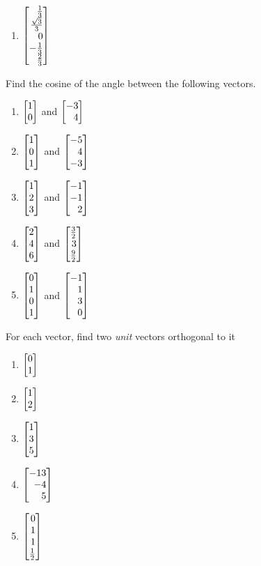 \begin{exercises}
\begin{problist}
\begin{enumerate}
			\item $\mat{\frac{1}{3}\\\frac{\sqrt{3}}{3}\\0\\-\frac{1}{3}\\\frac{2}{3}}$
		\end{enumerate}
		\prob Find the cosine of the angle between the following vectors.
		\begin{enumerate}
			\item $\mat{1\\0}$ and $\mat{-3\\4}$
			\item $\mat{1\\0\\1}$ and $\mat{-5\\4\\-3}$
			\item $\mat{1\\2\\3}$ and $\mat{-1\\-1\\2}$
			\item $\mat{2\\4\\6}$ and $\mat{\frac{3}{2}\\3\\\frac{9}{2}}$
			\item $\mat{0\\1\\0\\1}$ and $\mat{-1\\1\\3\\0}$
		\end{enumerate}
		\prob For each vector, find two \emph{unit} vectors orthogonal to it
		\begin{enumerate}
			\item $\mat{0\\1}$
			\item $\mat{1\\2}$
			\item $\mat{1\\3\\5}$
			\item $\mat{-13\\-4\\5}$
			\item $\mat{0\\1\\1\\\frac{1}{2}}$
		\end{enumerate}


\end{problist}
\end{exercises}
